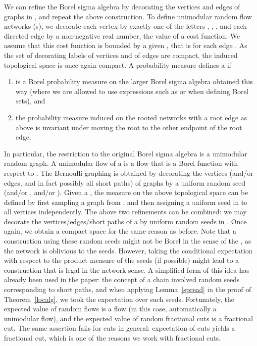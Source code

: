 \documentclass[12pt,a4paper]{article}
\renewcommand{\:}{\colon}
\begin{document}
We can refine the Borel sigma algebra by decorating the vertices and edges of graphs in , and repeat the above construction. 
To define unimodular random flow networks (s), we decorate each vertex by exactly one of the letters , , , and each directed edge by a non-negative real number, the value of a cost function. 
We assume that this cost function is bounded by a given , that is  for each edge . 
As the set of decorating labels  of vertices and  of edges are compact, the induced topological space is once again compact. 
A probability measure  defines a  if 
\begin{enumerate}
\item  is a Borel probability measure on the larger Borel sigma algebra  obtained this way (where we are allowed to use expressions such as  or  when defining Borel sets), and 
\item the probability measure  induced on the rooted networks with a root edge as above is invariant under moving the root to the other endpoint of the root edge. 
\end{enumerate}
In particular, the restriction  to the original Borel sigma algebra is a unimodular random graph. 
A unimodular flow of a  is a flow that is a Borel function with respect to . 
The Bernoulli graphing is obtained by decorating the vertices (and/or edges, and in fact possibly all short paths) of graphs  by a uniform random seed  (and/or , and/or ). 
Given a  , the measure  on the above topological space can be defined by first sampling a graph from , and then assigning a uniform seed in  to all vertices independently. 
The above two refinements can be combined: we may decorate the vertices/edges/short paths of a  by uniform random seeds in . 
Once again, we obtain a compact space for the same reason as before. 
Note that a construction using these random seeds might not be Borel in the sense of the , as the network is oblivious to the seeds. 
However, taking the conditional expectation with respect to the product measure of the seeds (if possible) might lead to a construction that is legal in the network sense. 
A simplified form of this idea has already been used in the paper: the concept of a chain involved random seeds  corresponding to short paths, and when applying Lemma~\ref{spread} in the proof of Theorem~\ref{localg}, we took the expectation over such seeds. 
Fortunately, the expected value of random flows is a flow (in this case, automatically a unimodular flow), and the expected value of random fractional cuts is a fractional cut. 
The same assertion fails for cuts in general: expectation of cuts yields a fractional cut, which is one of the reasons we work with fractional cuts. 
\end{document}
